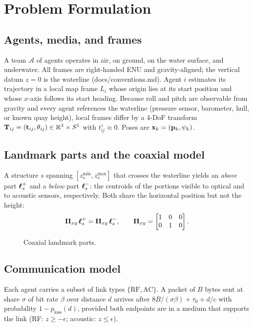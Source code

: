 \section{Problem Formulation}
\label{sec:problem}

\subsection{Agents, media, and frames}
A team $\mathcal{A}$ of agents operates in air, on ground, on the water surface, and underwater.
All frames are right-handed ENU and gravity-aligned; the vertical datum $z=0$ is the waterline
(docs/conventions.md). Agent $i$ estimates its trajectory in a local map frame $L_i$ whose
origin lies at its start position and whose $x$-axis follows its start heading. Because roll and
pitch are observable from gravity and every agent references the waterline (pressure sensor,
barometer, hull, or known quay height), local frames differ by a 4-DoF transform
$\mathbf{T}_{ij} = (\mathbf{t}_{ij}, \theta_{ij}) \in \mathbb{R}^3 \times S^1$ with $t^z_{ij} \approx 0$.
Poses are $\mathbf{x}_k = (\mathbf{p}_k, \psi_k)$.

\subsection{Landmark parts and the coaxial model}
A structure $s$ spanning $[z^{\min}_s, z^{\max}_s]$ that crosses the waterline yields an
\emph{above} part $\boldsymbol{\ell}^{+}_s$ and a \emph{below} part $\boldsymbol{\ell}^{-}_s$: the centroids of the portions
visible to optical and to acoustic sensors, respectively. Both share the horizontal position but
not the height:
\begin{equation}
  \boldsymbol{\Pi}_{xy}\,\boldsymbol{\ell}^{+}_s = \boldsymbol{\Pi}_{xy}\,\boldsymbol{\ell}^{-}_s, \qquad \boldsymbol{\Pi}_{xy} = \begin{bmatrix} 1 & 0 & 0\\ 0 & 1 & 0\end{bmatrix}.
  \label{eq:coaxial}
\end{equation}

\begin{figure}[t]
  \centering
  \caption{Coaxial landmark parts. }
  \label{fig:coaxial}
\end{figure}

\subsection{Communication model}
Each agent carries a subset of link types $\{\mathrm{RF}, \mathrm{AC}\}$. A packet of $B$ bytes
sent at share $\sigma$ of bit rate $\beta$ over distance $d$ arrives after
$8B/(\sigma\beta) + \tau_0 + d/c$ with probability $1 - p_{\mathrm{loss}}(d)$, provided both
endpoints are in a medium that supports the link (RF: $z \geq -\epsilon$; acoustic:
$z \leq \epsilon$). 

